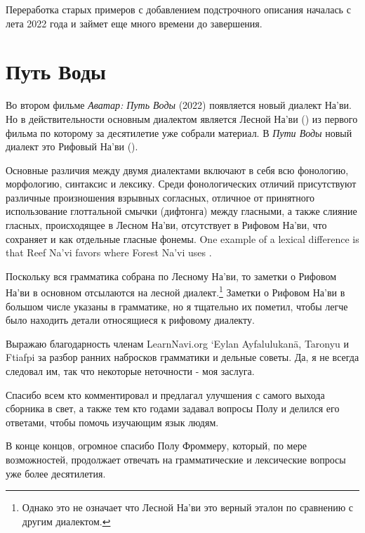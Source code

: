 Переработка старых примеров с добавлением подстрочного описания началась с лета 2022 года и займет еще много времени до завершения.


\section{Путь Воды}
Во втором фильме \textit{Аватар: Путь Воды} (2022) появляется новый диалект На'ви.  Но в действительности основным диалектом является Лесной На'ви () из первого фильма по которому за десятилетие уже собрали материал.
В \textit{Пути Воды}  новый диалект это Рифовый На'ви ().

Основные различия между двумя диалектами включают в себя всю
фонологию, морфологию, синтаксис и лексику.  Среди фонологических отличий присутствуют различные произношения взрывных согласных, отличное от принятного использование глоттальной смычки (дифтонга) между гласными, а также слияние гласных, происходящее в Лесном На'ви, отсутствует в Рифовом На'ви, что сохраняет  и  как отдельные гласные фонемы.
One example of a lexical difference is that Reef Na'vi
favors   where Forest Na'vi uses .

Поскольку вся грамматика собрана по Лесному На'ви, то заметки о Рифовом На'ви в основном отсылаются на лесной диалект.\footnote{Однако это не означает что Лесной На'ви это верный эталон по сравнению с другим диалектом.}
Заметки о Рифовом На'ви в большом числе указаны в грамматике, но я тщательно их пометил, чтобы легче было находить детали относящиеся к рифовому диалекту.



\vfill
Выражаю благодарность членам LearnNavi.org `Eylan Ayfalulukanä, Taronyu
и Ftiafpi за разбор ранних набросков грамматики и дельные советы.  Да, я не всегда следовал им, так что некоторые неточности - моя заслуга.

Спасибо всем кто комментировал и предлагал улучшения с самого выхода сборника в свет, а также тем кто годами задавал вопросы Полу и делился его ответами, чтобы помочь изучающим язык людям.

В конце концов, огромное спасибо Полу Фроммеру, который, по мере возможностей, продолжает отвечать на грамматические и лексические вопросы уже более десятилетия.



\bigskip

